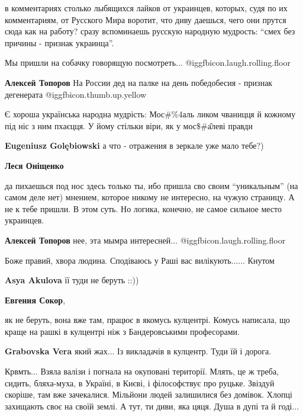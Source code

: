 \begin{itemize}
в комментариях столько лыбящихся лайков от украинцев, которых, судя по их
комментариям, от Русского Мира воротит, что диву даешься, чего они прутся сюда
как на работу? сразу вспоминаешь русскую народную мудрость: \enquote{смех без причины -
признак украинца}.

\begin{itemize} %
Мы пришли на собачку говорящую посмотреть...  @igg{fbicon.laugh.rolling.floor} 

\textbf{Алексей Топоров} На России дед на палке на день победобесия - признак дегенерата  @igg{fbicon.thumb.up.yellow} 


Є хороша українська народна мудрість: Мос\#\%4аль ликом чваницця й кожному під
ніс з ним пхаєцця. У йому стільки віри, як у мос\$\#\^алеві правди

\textbf{Eugeniusz Golębiowski} а что - отражения в зеркале уже мало тебе?)

\textbf{Леся Оніщенко} 

да пихаешься под нос здесь только ты, ибо пришла сво своим \enquote{уникальным} (на
самом деле нет) мнением, которое никому не интересно, на чужую страницу. А не к
тебе пришли. В этом суть. Но логика, конечно, не самое сильное место украинцев.

\textbf{Алексей Топоров} нее, эта мымра интересней...  @igg{fbicon.laugh.rolling.floor} 

\end{itemize} %

Боже правий, хвора людина. Сподіваюсь у Раші вас вилікують...... Кнутом

\begin{itemize} %
\textbf{Asya Akulova} її туди не беруть ::))

\textbf{Евгения Сокор}, 

як не беруть, вона вже там, працює в якомусь кулцентрі. Комусь написала, що
краще на рашкі в кулцентрі ніж з Бандеровськими професорами.

\textbf{Grabovska Vera} який жах... Із викладачів в кулцентр. Туди їй і дорога.
\end{itemize} %

Крвмть... Взяла валізи і погнала на окуповані території.
Млять, це ж треба, сидить, бляха-муха, в Україні, в Києві, і філософствує про руцьке.
Звіздуй скоріше, там вже зачекалися.
Мільйони людей залишилися без домівок. Хлопці захищають своє на своїй землі. А тут, ти диви, яка цяця.
Душа в дупі та й годі...


\end{itemize}
